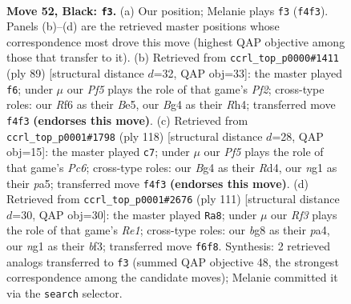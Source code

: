 \documentclass[11pt]{article}
\begin{document}
\clearpage

\begin{figure}[p]\centering
\begin{subfigure}{0.46\textwidth}\centering
\resizebox{\linewidth}{!}{%
\newchessgame
\chessboard[
  setfen={6B1/3k4/5r2/B7/P4pbp/1PK5/8/5RN1 b - - 4 52},
  showmover=false,
  pgfstyle=straightmove, color=movearrow, markmove={f4-f3}
]}
\caption{}
\end{subfigure}\hfill
\begin{subfigure}{0.46\textwidth}\centering
\resizebox{\linewidth}{!}{%
\newchessgame
\chessboard[
  setfen={5k2/5p2/8/4b3/7r/p2B1R2/P1P5/2K5 b - - 3 45},
  showmover=false,
  pgfstyle=straightmove, color=movearrow, markmove={f7-f6}
]}
\caption{}
\end{subfigure}
\\[4pt]
\begin{subfigure}{0.46\textwidth}\centering
\resizebox{\linewidth}{!}{%
\newchessgame
\chessboard[
  setfen={8/5p2/1rPBb1k1/p7/3R4/6P1/2K5/8 w - - 1 60},
  showmover=false,
  pgfstyle=straightmove, color=movearrow, markmove={c6-c7}
]}
\caption{}
\end{subfigure}\hfill
\begin{subfigure}{0.46\textwidth}\centering
\resizebox{\linewidth}{!}{%
\newchessgame
\chessboard[
  setfen={4r3/2kp1R2/8/4b3/P3P3/4PB2/4K3/8 b - - 4 56},
  showmover=false,
  pgfstyle=straightmove, color=movearrow, markmove={e8-a8}
]}
\caption{}
\end{subfigure}
\caption{\textbf{Move 52, Black: \texttt{f3}.} (a) Our position; Melanie plays \texttt{f3} (\texttt{f4f3}). Panels (b)--(d) are the retrieved master positions whose correspondence most drove this move (highest QAP objective among those that transfer to it). (b) Retrieved from \texttt{ccrl\_top\_p0000\#1411} (ply 89) [structural distance $d$=32, QAP obj=33]: the master played \texttt{f6}; under $\mu$ our \emph{Pf5} plays the role of that game's \emph{Pf2}; cross-type roles: our \emph{R}f6 as their \emph{B}e5, our \emph{B}g4 as their \emph{R}h4; transferred move \texttt{f4f3} \textbf{(endorses this move)}. (c) Retrieved from \texttt{ccrl\_top\_p0001\#1798} (ply 118) [structural distance $d$=28, QAP obj=15]: the master played \texttt{c7}; under $\mu$ our \emph{Pf5} plays the role of that game's \emph{Pc6}; cross-type roles: our \emph{B}g4 as their \emph{R}d4, our \emph{n}g1 as their \emph{p}a5; transferred move \texttt{f4f3} \textbf{(endorses this move)}. (d) Retrieved from \texttt{ccrl\_top\_p0001\#2676} (ply 111) [structural distance $d$=30, QAP obj=30]: the master played \texttt{Ra8}; under $\mu$ our \emph{Rf3} plays the role of that game's \emph{Re1}; cross-type roles: our \emph{b}g8 as their \emph{p}a4, our \emph{n}g1 as their \emph{b}f3; transferred move \texttt{f6f8}. Synthesis: 2 retrieved analogs transferred to \texttt{f3} (summed QAP objective 48, the strongest correspondence among the candidate moves); Melanie committed it via the \texttt{search} selector.}
\label{fig:thought-m103}
\end{figure}
\end{document}
